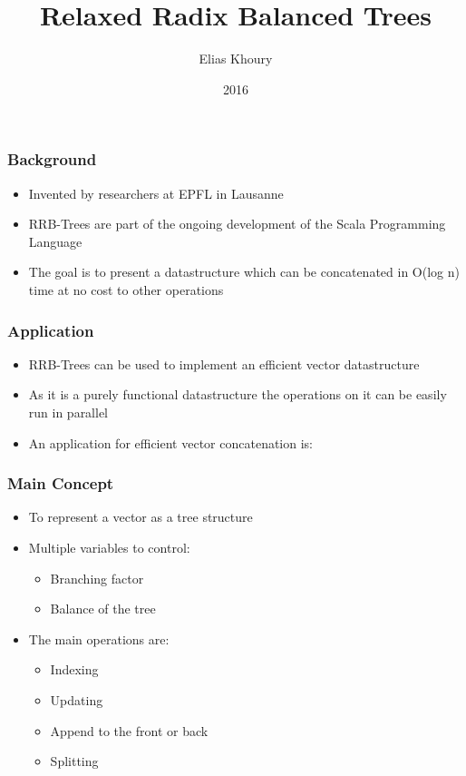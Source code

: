 \documentclass{beamer}
\title{Relaxed Radix Balanced Trees}
\author{Elias Khoury}
\date{2016}
\begin{document}
 
\frame{\titlepage}
 
\begin{frame}
\frametitle{Background}

\begin{itemize}

	\item Invented by researchers at EPFL in Lausanne\cite{bagwell2011rrb} \pause
	\item RRB-Trees are part of the ongoing development of the Scala Programming Language \pause
	\item The goal is to present a datastructure which can be concatenated in O(log n) time at no cost to other operations \pause

\end{itemize}

\end{frame}
 
\begin{frame}

\frametitle{Application}

\begin{itemize}

	\item RRB-Trees can be used to implement an efficient vector datastructure
	\item As it is a purely functional datastructure the operations on it can be easily run in parallel  
	\item An application for efficient vector concatenation is:

\end{itemize}

\end{frame}
 
\begin{frame}
\frametitle{Main Concept}


\begin{itemize}

	\item To represent a vector as a tree structure \pause
	\item Multiple variables to control:
		\begin{itemize}
			\item Branching factor
			\item Balance of the tree
		\end{itemize}
	\pause
	\item The main operations are:
	\noindent\parbox[t]{2.4in}{\raggedright%
		\begin{itemize}
			\item Indexing
			\item Updating
		\end{itemize}
	}%
	\noindent\parbox[t]{2.4in}{\raggedright%
		\begin{itemize}
			\item Append to the front or back
			\item Splitting
		\end{itemize}
	}%

\end{itemize}

\end{frame}
\end{document}
